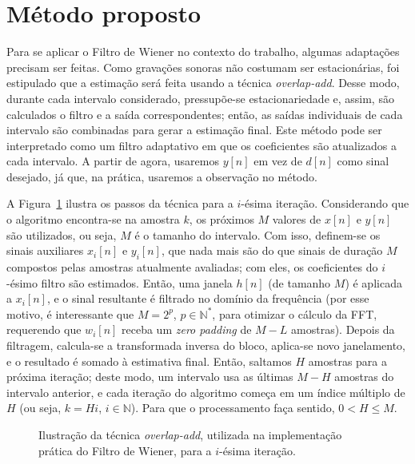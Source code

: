 \section{Método proposto}
\label{section:wiener:method}

Para se aplicar o Filtro de Wiener no contexto do trabalho, algumas adaptações precisam
ser feitas. Como gravações sonoras não costumam ser estacionárias, foi estipulado que a
estimação será feita usando a técnica \textit{overlap-add}. Desse modo, durante cada
intervalo considerado, pressupõe-se estacionariedade e, assim, são calculados o filtro
e a saída correspondentes; então, as saídas individuais de cada intervalo são
combinadas para gerar a estimação final. Este método pode ser interpretado como um
filtro adaptativo em que os coeficientes são atualizados a cada intervalo. A partir de
agora, usaremos $y[n]$ em vez de $d[n]$ como sinal desejado, já que, na prática,
usaremos a observação no método.

A Figura~\ref{fig:wf:overlap-add} ilustra os passos da técnica para a $i$-ésima
iteração. Considerando que o algoritmo encontra-se na amostra $k$, os próximos
$M$ valores de $x[n]$ e $y[n]$ são utilizados, ou seja, $M$ é o tamanho do
intervalo. Com isso, definem-se os sinais auxiliares $x_i[n]$ e
$y_i[n]$, que nada mais são do que sinais de duração $M$
compostos pelas amostras atualmente avaliadas; com eles, os coeficientes do $i$-ésimo
filtro são estimados. Então, uma janela $h[n]$ (de tamanho $M$) é aplicada a $x_i[n]$, e o sinal resultante é
filtrado no domínio da frequência (por esse motivo, é interessante que $M = 2^p$, $p
	\in \mathbb{N}^*$, para otimizar o cálculo da FFT, requerendo que $w_i[n]$ receba um \textit{zero
	padding} de $M - L$ amostras). Depois da filtragem, calcula-se a transformada inversa
do bloco, aplica-se novo janelamento, e o resultado é somado à estimativa final. Então,
saltamos $H$ amostras para a próxima iteração; deste modo, um intervalo usa as últimas
$M-H$ amostras do intervalo anterior, e cada iteração do algoritmo começa em um índice
múltiplo de $H$ (ou seja, $k = Hi$, $i \in \mathbb{N}$). Para que o processamento faça
sentido, $0 < H \leq M$.
\begin{figure}
	\centering
	
	\caption[Ilustração do método utilizado no Filtro de Wiener]{Ilustração da técnica \textit{overlap-add}, utilizada na implementação prática do Filtro de Wiener, para a $i$-ésima iteração.}
	\label{fig:wf:overlap-add}
\end{figure}

